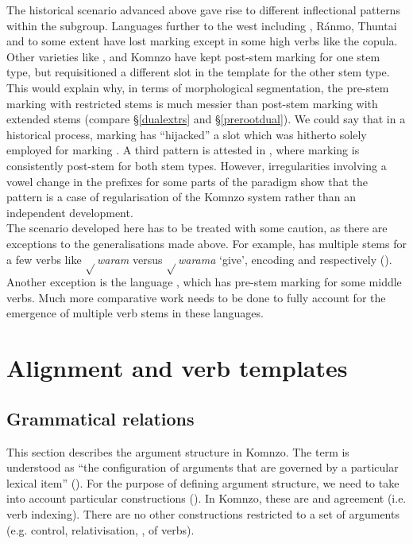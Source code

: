 The historical scenario advanced above gave rise to different inflectional patterns within the  subgroup. Languages further to the west including , Ránmo,  Thuntai and to some extent  have lost  marking except in some high  verbs like the copula. Other varieties like ,  and Komnzo have kept post-stem  marking for one stem type, but requisitioned a different slot in the template for the other stem type. This would explain why, in terms of morphological segmentation, the pre-stem  marking with restricted stems is much messier than post-stem  marking with extended stems (compare \S{}\ref{dualextrs} and \S{}\ref{prerootdual}). We could say that in a historical process,  marking has ``hijacked'' a slot which was hitherto solely employed for marking . A third pattern is attested in , where  marking is consistently post-stem for both stem types. However, irregularities involving a vowel change in the prefixes for some parts of the paradigm show that the  pattern is a case of regularisation of the Komnzo system rather than an independent development.\\

The scenario developed here has to be treated with some caution, as there are exceptions to the generalisations made above. For example,  has multiple stems for a few verbs like $\sqrt{}$\emph{waram} versus $\sqrt{}$\emph{warama} `give', encoding  and   respectively (\citealt{Evans:nen}). Another exception is the  language , which has pre-stem  marking for some middle verbs. Much more comparative work needs to be done to fully account for the emergence of multiple verb stems in these languages.

\section{Alignment and verb templates} \label{alignmtemplates}

\subsection{Grammatical relations} \label{grammrel}

This section describes the argument structure in Komnzo. The term is understood as ``the configuration of arguments that are governed by a particular lexical item'' (\citealt[1130]{HaspelmathBardey:2004}). For the purpose of defining argument structure, we need to take into account particular constructions (\citealt[433]{Bickel:2011wo}). In Komnzo, these are  and agreement (i.e. verb indexing). There are no other constructions restricted to a set of arguments (e.g. control, relativisation, ,  of verbs).\\

